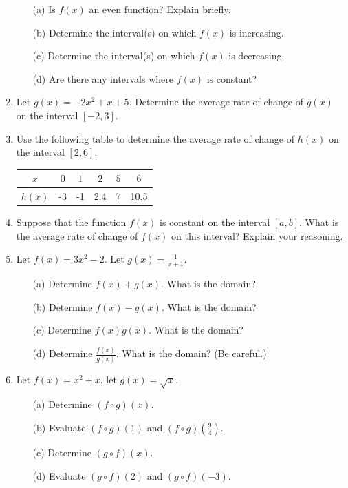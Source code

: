 \documentclass[12pt]{amsart}
\begin{document}
\begin{enumerate}
\begin{itemize}
\item[(a)] Is $f(x)$ an even function? Explain briefly. 
\item[(b)] Determine the interval(s) on which $f(x)$ is increasing.
\item[(c)] Determine the interval(s) on which $f(x)$ is decreasing.
\item[(d)] Are there any intervals where $f(x)$ is constant?
\end{itemize}

\item Let $g(x) = -2x^2+ x + 5$. Determine the average rate of change of $g(x)$ on the interval $[-2, 3]$. 

\item Use the following table to determine the average rate of change of $h(x)$ on the interval $[2, 6]$.
\begin{tabular}{| c | c | c | c | c | c |}
\hline
$x$ & $0$ & $1$ & $2$ & $5$ & $6$ \\
\hline
$h(x)$ & -3  & -1  & 2.4  & 7  & 10.5 \\
\hline
\end{tabular}

\item Suppose that the function $f(x)$ is constant on the interval $[a, b]$. What is the average rate of change of $f(x)$ on this interval? Explain your reasoning.

\item Let $f(x) = 3x^2- 2$. Let $g(x) = \frac{1}{x+1}$.

\begin{itemize}
\item[(a)] Determine $f(x) + g(x)$. What is the domain?
\item[(b)] Determine $f(x) - g(x)$. What is the domain?
\item[(c)] Determine $f(x)g(x)$. What is the domain?
\item[(d)] Determine $\frac{f(x)}{g(x)}$. What is the domain? (Be careful.)
\end{itemize}

\item Let $f(x) = x^2+x$, let $g(x) = \sqrt{x}$. 

\begin{itemize}
\item[(a)] Determine $(f \circ g)(x)$.
\item[(b)] Evaluate $(f \circ g)(1)$ and $(f \circ g)(\frac{9}{4})$.
\item[(c)] Determine $(g \circ f)(x)$.
\item[(d)] Evaluate $(g \circ f)(2)$ and $(g \circ f)(-3)$.
\end{itemize}


\end{enumerate}
\end{document}

